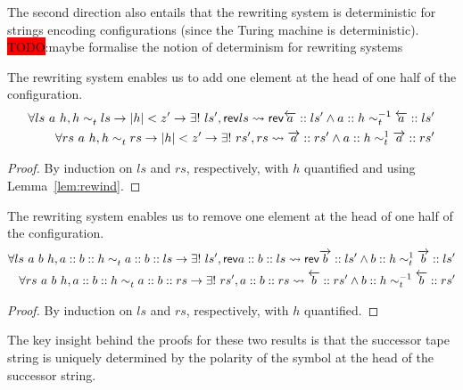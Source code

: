 \documentclass[a4paper,UKenglish,cleveref, autoref]{lipics-v2019}
\newcommand{\TODO}[1]{\colorbox{red}{\LARGE TODO}:#1}
\newcommand{\strent}{\rightsquigarrow}
\begin{document}
The second direction also entails that the rewriting system is deterministic for strings encoding configurations (since the Turing machine is deterministic). 
\TODO{maybe formalise the notion of determinism for rewriting systems}

\begin{lemma}\label{lem:tapeadd}
  The rewriting system enables us to add one element at the head of one half of the configuration.
  \begin{align*}
    \forall ls~a~h, h \reprt{} ls \rightarrow \length{h} < z' \rightarrow \exists!~ls', \rev{ls} \strent{} \rev{\polneg{a} :: ls'} \land a :: h \reprt{-1} \polneg{a} :: ls' \\
    \forall rs~a~h, h \reprt{} rs \rightarrow \length{h} < z' \rightarrow \exists!~rs', rs \strent{} \polpos{a} :: rs' \land a :: h \reprt{1} \polpos{a} :: rs'
  \end{align*}
\end{lemma}
\begin{proof}
  By induction on $ls$ and $rs$, respectively, with $h$ quantified and using Lemma~\ref{lem:rewind}.
\end{proof}
\begin{lemma}\label{lem:taperem}
  The rewriting system enables us to remove one element at the head of one half of the configuration.
  \begin{align*}
    \forall ls~a~b~h, a::b::h \reprt{} a::b::ls \rightarrow \exists!~ls', \rev{a :: b :: ls} \strent{} \rev{\polpos{b} :: ls'} \land b :: h \reprt{1} \polpos{b} :: ls' \\
    \forall rs~a~b~h, a :: b :: h \reprt{} a :: b :: rs \rightarrow \exists!~rs', a :: b :: rs \strent{} \polneg{b} :: rs' \land b :: h \reprt{-1} \polneg{b} :: rs'
  \end{align*}
\end{lemma}
\begin{proof}
  By induction on $ls$ and $rs$, respectively, with $h$ quantified. 
\end{proof}

The key insight behind the proofs for these two results is that the successor tape string is uniquely determined by the polarity of the symbol at the head of the successor string. 
\end{document}
